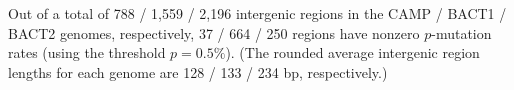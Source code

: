 Out of a total of 788 / 1,559 / 2,196 intergenic regions in the CAMP / BACT1 / BACT2 genomes, respectively, 37 / 664 / 250 regions have nonzero $p$-mutation rates (using the threshold $p=0.5\%$). (The rounded average intergenic region lengths for each genome are 128 / 133 / 234 bp, respectively.)\endinput
